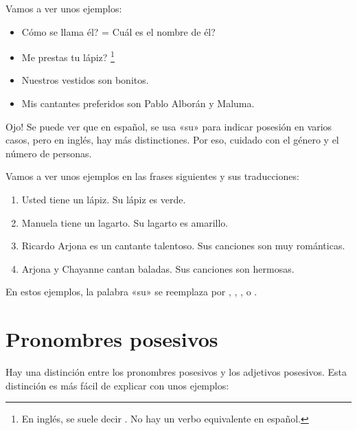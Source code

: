 Vamos a ver unos ejemplos:
\begin{itemize}
	\item \textquestiondown C\'omo se llama \'el? =
		\textquestiondown Cu\'al es el nombre de \'el?
		\arr {}
	\item \textquestiondown Me prestas tu l\'apiz?
		\arr {} \footnote{En inglés, se suele decir
		. No hay un verbo equivalente en espa\~nol.}
	\item Nuestros vestidos son bonitos.
		\arr {}
	\item Mis cantantes preferidos son Pablo Albor\'an y Maluma.
		\arr {}
\end{itemize}


\begin{conf}{\textexclamdown Ojo!}
	Se puede ver que en espa\~nol, se usa «su» para indicar posesi\'on
	en varios casos, pero en ingl\'es, hay más distinctiones. Por eso,
	cuidado con el g\'enero y el n\'umero de personas.
\end{conf}


Vamos a ver unos ejemplos en las frases siguientes y sus traducciones:

\begin{enumerate}
	\item Usted tiene un lápiz. Su l\'apiz es verde.
		\arr {}
	\item Manuela tiene un lagarto. Su lagarto es amarillo.
		\arr {}
	\item Ricardo Arjona es un cantante talentoso. Sus canciones son muy rom\'anticas.
		\arr {}
	\item Arjona y Chayanne cantan baladas. Sus canciones son hermosas.
		\arr {}
\end{enumerate}

En estos ejemplos, la palabra «su» se reemplaza
por , , , o .

\section{Pronombres posesivos}

Hay una distinci\'on entre los pronombres posesivos y los adjetivos posesivos.
Esta distinci\'on es m\'as f\'acil de explicar con unos ejemplos:

